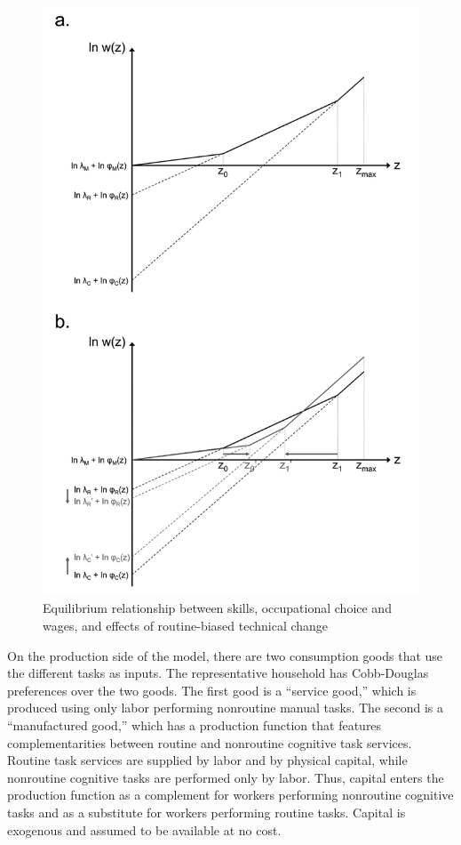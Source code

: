 \documentclass[12pt]{article}
\theoremstyle{definition}
\begin{document}
\begin{figure}[H]
    \noindent
    \caption{Equilibrium relationship between skills, occupational choice and wages, and effects of routine-biased technical change}
    \centerline{\includegraphics[scale=0.6]{cortes2016_fig1.png}}
    \label{fig1}
\end{figure}

On the production side of the model, there are two consumption goods that use the different tasks as inputs. The representative household has Cobb-Douglas preferences over the two goods. The first good is a ``service good,'' which is produced using only labor performing nonroutine manual tasks. The second is a ``manufactured good,'' which has a production function that features complementarities between routine and nonroutine cognitive task services. Routine task services are supplied by labor and by physical capital, while nonroutine cognitive tasks are performed only by labor. Thus, capital enters the production function as a complement for workers performing nonroutine cognitive tasks and as a substitute for workers performing routine tasks. Capital is exogenous and assumed to be available at no cost.
\end{document}
